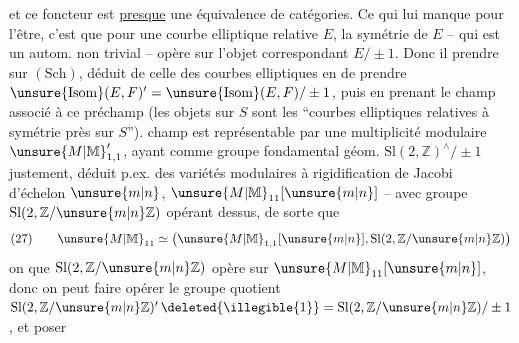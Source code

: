 et ce foncteur est \uline{presque} une équivalence de catégories. Ce qui lui manque pour l'être, c'est que pour une courbe elliptique relative $E$, la symétrie  de $E$ -- qui est un autom. non trivial -- opère  sur l'objet correspondant $E/\pm1$. Donc il  prendre    sur $(\mathrm{Sch})$, déduit de celle des courbes elliptiques en  de prendre $\unsure{\mathrm{Isom}}(E,F)'=\unsure{\mathrm{Isom}}(E,F)/\pm1$, puis en prenant le champ associé à ce préchamp (les objets sur $S$ sont les ``courbes elliptiques relatives à symétrie près sur $S$'').  champ est représentable par une multiplicité modulaire $\unsure{M|\mathbb M}'_{1,1}$,  ayant comme groupe fondamental géom. $\mathrm{Sl}(2,\mathbb{Z})^{\wedge}/\pm1$ justement, déduit  p.ex. des variétés modulaires à rigidification de Jacobi d'échelon $\unsure{m|n}$, $\unsure{M|\mathbb M}_{11}[\unsure{m|n}]$ -- avec groupe $\mathrm{Sl}(2,\mathbb{Z}/\unsure{m|n}\mathbb{Z})$ opérant dessus, de sorte que
\[
 (27)\qquad \unsure{M|\mathbb M}_{11}\simeq \bigl(\unsure{M|\mathbb M}_{1,1}[\unsure{m|n}],\mathrm{Sl}(2,\mathbb{Z}/\unsure{m|n}\mathbb{Z})\bigr)
\]
on  que  $\mathrm{Sl}(2,\mathbb{Z}/\unsure{m|n}\mathbb{Z})$ opère  sur $\unsure{M|\mathbb M}_{11}[\unsure{m|n}]$, donc on peut faire opérer le groupe quotient $\mathrm{Sl}(2,\mathbb{Z}/\unsure{m|n}\mathbb{Z})'\,\deleted{\illegible{1}}=\mathrm{Sl}(2,\mathbb{Z}/\unsure{m|n}\mathbb{Z})/\pm1$, et poser



